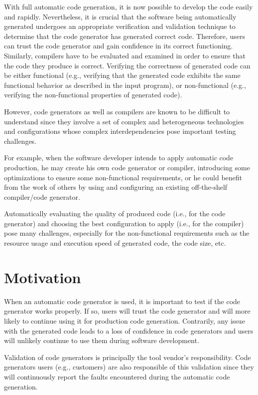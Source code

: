 With full automatic code generation, it is now possible to develop the code easily and rapidly. Nevertheless, it is crucial that the software being automatically generated undergoes an appropriate verification and validation technique to determine that the code generator has generated correct code. Therefore, users can trust the code generator and gain confidence in its correct functioning. Similarly, compilers have to be evaluated and examined in order to ensure that the code they produce is correct. Verifying the correctness of generated code can be either functional (e.g., verifying that the generated code exhibits the same functional behavior as described in the input program), or non-functional (e.g., verifying the non-functional properties of generated code).

However, code generators as well as compilers are known to be difficult to understand since they involve a set of complex and heterogeneous technologies and configurations whose complex interdependencies pose important testing challenges. 

For example, when the software developer intends to apply automatic code production, he may create his own code generator or compiler, introducing some optimizations to ensure some non-functional requirements, or he could benefit from the work of others by using and configuring an existing off-the-shelf compiler/code generator. 

Automatically evaluating the quality of produced code (i.e., for the code generator) and choosing the best configuration to apply (i.e., for the compiler) pose many challenges, especially for the non-functional requirements such as the resource usage and execution speed of generated code, the code size, etc.


\section{Motivation}

When an automatic code generator is used, it is important to test if the code generator works properly.
If so, users will trust the code generator and will more likely to continue using it for production code generation. Contrarily, any issue with the generated code leads to a loss of confidence in code generators and users will unlikely continue to use them during software development.
 
Validation of code generators is principally the tool vendor's responsibility. Code generators users (e.g., customers) are also responsible of this validation since they will continuously report the faults encountered during the automatic code generation. 

